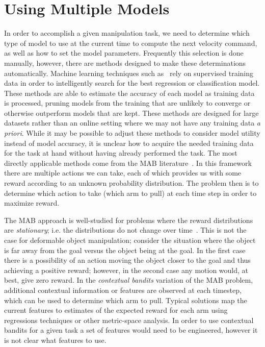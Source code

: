 \section{Using Multiple Models}

In order to accomplish a given manipulation task, we need to determine which type of model to use at the current time to compute the next velocity command, as well as how to set the model parameters. Frequently this selection is done manually, however, there are methods designed to make these determinations automatically. Machine learning techniques such as~\cite{Maron1994,Sparks2015} rely on supervised training data in order to intelligently search for the best regression or classification model. These methods are able to estimate the accuracy of each model as training data is processed, pruning models from the training that are unlikely to converge or otherwise outperform models that are kept. These methods are designed for large datasets rather than an online setting where we may not have any training data \textit{a priori}. While it may be possible to adjust these methods to consider model utility instead of model accuracy, it is unclear how to acquire the needed training data for the task at hand without having already performed the task. The most directly applicable methods come from the \ac{MAB} literature~\cite{Auer2002,Gittins2011,Whittle1988}. In this framework there are multiple actions we can take, each of which provides us with some reward according to an unknown probability distribution. The problem then is to determine which action to take (which arm to pull) at each time step in order to maximize reward.

The \ac{MAB} approach is well-studied for problems where the reward distributions are \textit{stationary}; i.e. the distributions do not change over time~\cite{Auer2002,Agrawal2012}. This is not the case for deformable object manipulation; consider the situation where the object is far away from the goal versus the object being at the goal. In the first case there is a possibility of an action moving the object closer to the goal and thus achieving a positive reward; however, in the second case any motion would, at best, give zero reward. In the \textit{contextual bandits} \cite{Langford2008,Slivkins2014} variation of the \ac{MAB} problem, additional contextual information or features are observed at each timestep, which can be used to determine which arm to pull. Typical solutions map the current features to estimates of the expected reward for each arm using regressions techniques or other metric-space analysis. In order to use contextual bandits for a given task a set of features would need to be engineered, however it is not clear what features to use.

